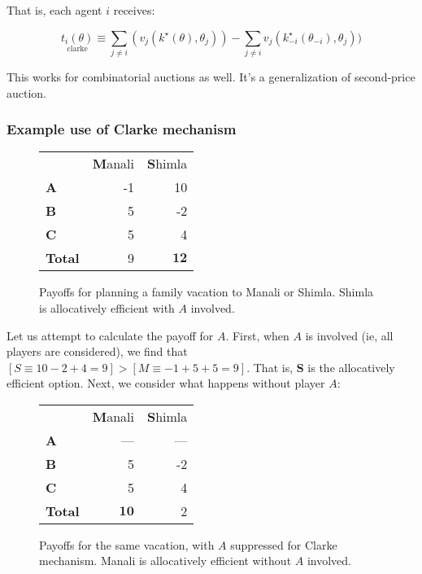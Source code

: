 \documentclass[10pt,a4paper]{article}
\begin{document}
That is, each agent $i$ receives:

\begin{equation}
    \underset{\text{clarke}}{t_i(\theta)} \equiv
    \sum_{j \neq i}(v_j(k^\star(\theta), \theta_j)) - \sum_{j \neq i} v_j(k^\star_{-i}(\theta_{-i}), \theta_j))
\end{equation}

This works for combinatorial auctions as well. It's a generalization
of second-price auction.

\subsubsection{Example use of Clarke mechanism}

\begin{figure}[H]
\begin{center}
\begin{tabular}{l r r }
& \textbf{M}anali & \textbf{S}himla  \\
\textbf{A} &-1  &10   \\
\textbf{B} & 5  &-2  \\
\textbf{C} & 5 & 4   \\
\textbf{Total} & 9 & $\mathbf{12}$   \\
\end{tabular}
\caption{Payoffs for planning a family vacation to Manali or Shimla. Shimla is allocatively efficient with $A$ involved.}
\end{center}
\end{figure}

Let us attempt to calculate the payoff for $A$. First, when $A$ is involved (ie, all players are considered),
we find that $[S \equiv 10 - 2 + 4 = 9] > [M \equiv -1 + 5 + 5 = 9]$. That is,
\textbf{S} is the allocatively efficient option. Next, we consider what
happens without player $A$:

\begin{figure}[H]
\begin{center}
\begin{tabular}{l r r}
& \textbf{M}anali  & \textbf{S}himla \\
\textbf{A}  & ---  & ---   \\
\textbf{B}  & 5  & -2  \\
\textbf{C}  & 5  & 4          \\
\textbf{Total} & $\mathbf{10}$ & 2   \\
\end{tabular}
\caption{Payoffs for the same vacation, with $A$ suppressed for Clarke mechanism. Manali is allocatively efficient 
        without $A$ involved.}
\end{center}
\end{figure}
\end{document}
